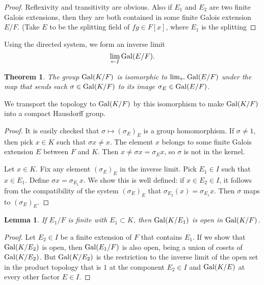 \documentclass{amsart}
\newtheorem{theorem}[equation]{Theorem}
\newtheorem{lemma}[equation]{Lemma}
\begin{document}
\begin{proof}  Reflexivity and transitivity are obvious.  Also if $E_1$ and
$E_2$ are two finite Galois extensions, then they are both contained in
some finite Galois extension $E/F$.  (Take $E$ to be the splitting field
of $fg\in F[x]$, where $E_1$ is the splitting 
\end{proof}

Using the directed system, we form an inverse limit
\[
\lim_{\leftarrow I} {\operatorname{Gal}}(E/F).
\]

\begin{theorem} The group ${\operatorname{Gal}}(K/F)$ is isomorphic to $\lim_{\leftarrow}{\operatorname{Gal}}(E/F)$
under the map that sends each $\sigma\in{\operatorname{Gal}}(K/F)$ to its image $\sigma_E\in {\operatorname{Gal}}(E/F)$.
\end{theorem}

We transport the topology to ${\operatorname{Gal}}(K/F)$ by this isomorphism to make ${\operatorname{Gal}}(K/F)$ into a compact Hausdorff group.

\begin{proof} It is easily checked that $\sigma\mapsto (\sigma_E)_E$ is a group homomorphism.
  If $\sigma\ne1$, then pick $x\in K$ such
that $\sigma x\ne x$.  The element $x$ belongs to some finite Galois extension $E$ between
$F$ and $K$.  Then $x\ne \sigma x = \sigma_E x$, so $\sigma$ is not in the kernel.

  Let $x\in K$.  Fix any element
$(\sigma_E)_E$ in the inverse limit.  Pick $E_1\in I$ such that $x\in E_1$.
Define $\sigma x = \sigma_{E_1} x$.  We show this is well defined: 
if $x\in {E_2}\in I$, it follows from the compatibility
of the system $(\sigma_E)_E$ that $\sigma_{E_2}(x) = \sigma_{E_1}x$.  Then $\sigma$
maps to $(\sigma_E)_E$.
\end{proof}

\begin{lemma}  If $E_1/F$ is finite with $E_1\subset K$,
then ${\operatorname{Gal}}(K/E_1)$ is open in ${\operatorname{Gal}}(K/F)$.
\end{lemma}

\begin{proof}  Let $E_2\in I$ be a finite extension of $F$ that contains $E_1$.  If we show
that ${\operatorname{Gal}}(K/E_2)$ is open, then ${\operatorname{Gal}}(E_1/F)$ is also open, being a union
of cosets of ${\operatorname{Gal}}(K/E_2)$.  But ${\operatorname{Gal}}(K/E_2)$ is the restriction to the
inverse limit of the open set in the product topology that is ${1}$ at the
component $E_2\in I$ and ${\operatorname{Gal}}(K/E)$ at every other factor $E\in I$.
\end{proof}
\end{document}
